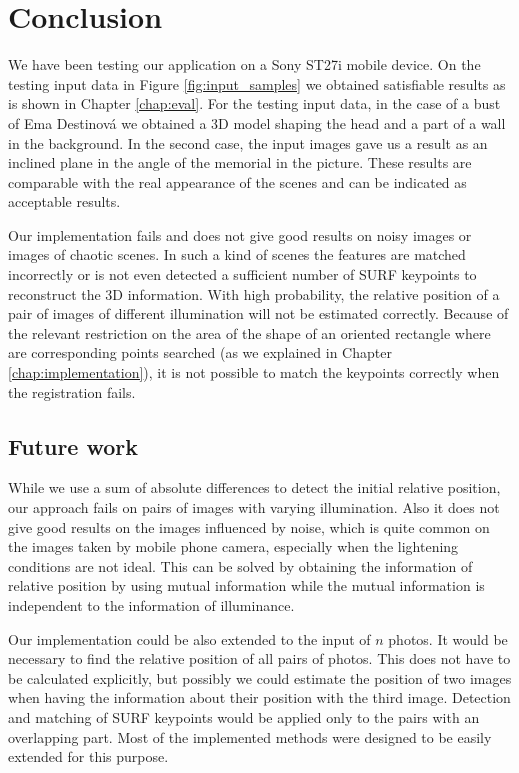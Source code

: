 \chapter*{Conclusion}

We have been testing our application on a Sony ST27i mobile device.
On the testing input data in Figure \ref{fig:input_samples} we obtained satisfiable results as is shown in Chapter \ref{chap:eval}.
For the testing input data, in the case of a bust of Ema Destinová we obtained a 3D model shaping the head and a part of a wall in the background.
In the second case, the input images gave us a result as an inclined plane in the angle of the memorial in the picture.
These results are comparable with the real appearance of the scenes and can be indicated as acceptable results.

Our implementation fails and does not give good results on noisy images or images of chaotic scenes.
In such a kind of scenes the features are matched incorrectly or is not even detected a sufficient number of SURF keypoints to reconstruct the 3D information. 
With high probability, the relative position of a pair of images of different illumination will not be estimated correctly.
Because of the relevant restriction on the area of the shape of an oriented rectangle where are corresponding points searched (as we explained in Chapter \ref{chap:implementation}),
it is not possible to match the keypoints correctly when the registration fails.

\section{Future work}

While we use a sum of absolute differences to detect the initial relative position, our approach fails on pairs of images with varying illumination.
Also it does not give good results on the images influenced by noise, which is quite common on the images taken by mobile phone camera, 
especially when the lightening conditions are not ideal.
This can be solved by obtaining the information of relative position by using mutual information while the mutual information is independent to the information of illuminance.

Our implementation could be also extended to the input of $n$ photos. 
It would be necessary to find the relative position of all pairs of photos.
This does not have to be calculated explicitly, but possibly we could estimate the position of two images when having the information about their position with the third image.
Detection and matching of SURF keypoints would be applied only to the pairs with an overlapping part.
Most of the implemented methods were designed to be easily extended for this purpose.

